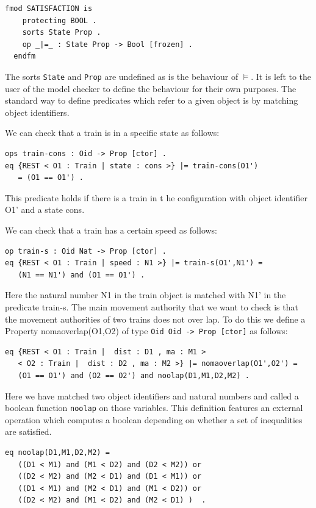 \begin{lstlisting}[caption =  The Maude Satisfaction module, label =code:satisfaction ]
  fmod SATISFACTION is  
    protecting BOOL .  
    sorts State Prop .  
    op _|=_ : State Prop -> Bool [frozen] .  
  endfm
\end{lstlisting}
\medskip
The sorts \texttt{State} and \texttt{Prop} are undefined as is the behaviour of $\models$. It is left to the user of the model checker to define the behaviour for their own purposes. The standard way to define predicates which refer to a given object is by matching object identifiers.

We can check that a train is in a specific state as follows:
\begin{lstlisting}[caption = The constant speed property]
ops train-cons : Oid -> Prop [ctor] .
eq {REST < O1 : Train | state : cons >} |= train-cons(O1') 
   = (O1 == O1') . 
\end{lstlisting}
This predicate holds if there is a train in t he configuration with object identifier O1' and a state cons. 

We can check that a train has a certain speed as follows:
\begin{lstlisting}[caption = The speed property]
op train-s : Oid Nat -> Prop [ctor] .
eq {REST < O1 : Train | speed : N1 >} |= train-s(O1',N1') = 
   (N1 == N1') and (O1 == O1') .
\end{lstlisting}

Here the natural number N1 in the train object is matched with N1' in the predicate train-s.
The main movement authority that we want to check is that the movement authorities of two trains does not over lap.
To do this we define a Property nomaoverlap(O1,O2) of type \texttt{Oid Oid -> Prop [ctor]} as follows: 

\begin{lstlisting}
eq {REST < O1 : Train |  dist : D1 , ma : M1 > 
   < O2 : Train |  dist : D2 , ma : M2 >} |= nomaoverlap(O1',O2') = 
   (O1 == O1') and (O2 == O2') and noolap(D1,M1,D2,M2) .
\end{lstlisting}
Here we have matched two object identifiers and natural numbers and called a boolean function \texttt{noolap} on those variables. This definition features an external operation which computes a boolean depending on whether a set of inequalities are satisfied. 

\begin{lstlisting}[caption = The no overlap operation]
eq noolap(D1,M1,D2,M2) = 
   ((D1 < M1) and (M1 < D2) and (D2 < M2)) or 
   ((D2 < M2) and (M2 < D1) and (D1 < M1)) or 
   ((D1 < M1) and (M2 < D1) and (M1 < D2)) or 
   ((D2 < M2) and (M1 < D2) and (M2 < D1) )  .  
\end{lstlisting}

